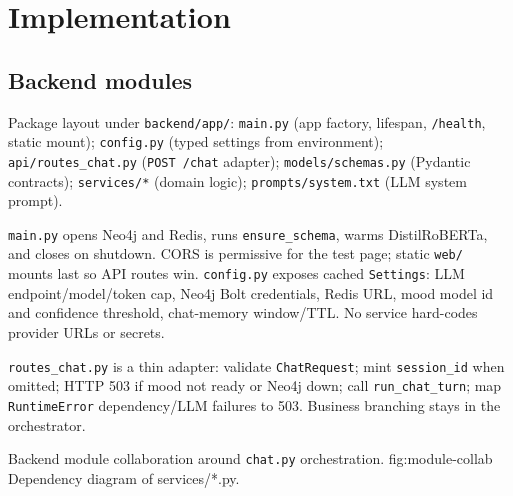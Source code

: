\chapter{Implementation}
\label{ch:backend}
\label{ch:workflow}
\label{ch:api}

\section{Backend modules}

Package layout under \texttt{backend/app/}: \texttt{main.py} (app factory, lifespan, \texttt{/health}, static mount); \texttt{config.py} (typed settings from environment); \texttt{api/routes\_chat.py} (\texttt{POST /chat} adapter); \texttt{models/schemas.py} (Pydantic contracts); \texttt{services/*} (domain logic); \texttt{prompts/system.txt} (LLM system prompt).

\texttt{main.py} opens Neo4j and Redis, runs \texttt{ensure\_schema}, warms DistilRoBERTa, and closes on shutdown. CORS is permissive for the test page; static \texttt{web/} mounts last so API routes win. \texttt{config.py} exposes cached \texttt{Settings}: LLM endpoint/model/token cap, Neo4j Bolt credentials, Redis URL, mood model id and confidence threshold, chat-memory window/TTL. No service hard-codes provider URLs or secrets.

\texttt{routes\_chat.py} is a thin adapter: validate \texttt{ChatRequest}; mint \texttt{session\_id} when omitted; HTTP 503 if mood not ready or Neo4j down; call \texttt{run\_chat\_turn}; map \texttt{RuntimeError} dependency/LLM failures to 503. Business branching stays in the orchestrator.

%
{Backend module collaboration around \texttt{chat.py} orchestration.}%
{fig:module-collab}%
{Dependency diagram of services/*.py.}


